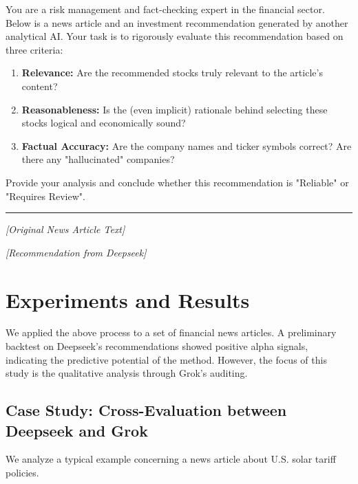 \documentclass{article}
\begin{document}
\begin{auditbox}[title={Prompt sent to Grok}]
You are a risk management and fact-checking expert in the financial sector. Below is a news article and an investment recommendation generated by another analytical AI. Your task is to rigorously evaluate this recommendation based on three criteria:
\begin{enumerate}
    \item \textbf{Relevance:} Are the recommended stocks truly relevant to the article's content?
    \item \textbf{Reasonableness:} Is the (even implicit) rationale behind selecting these stocks logical and economically sound?
    \item \textbf{Factual Accuracy:} Are the company names and ticker symbols correct? Are there any "hallucinated" companies?
\end{enumerate}
Provide your analysis and conclude whether this recommendation is "Reliable" or "Requires Review".

\vspace{5pt}
\noindent\rule{\textwidth}{0.4pt}
\textit{[Original News Article Text]}

\textit{[Recommendation from Deepseek]}
\end{auditbox}


\section{Experiments and Results}

We applied the above process to a set of financial news articles. A preliminary backtest on Deepseek's recommendations showed positive alpha signals, indicating the predictive potential of the method. However, the focus of this study is the qualitative analysis through Grok's auditing.

\subsection{Case Study: Cross-Evaluation between Deepseek and Grok}

We analyze a typical example concerning a news article about U.S. solar tariff policies.
\end{document}
